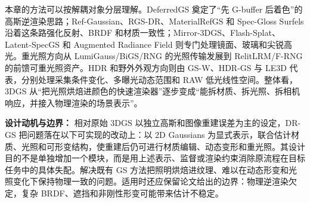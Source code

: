 \begin{takeaway}
本章的方法可以按解耦对象分层理解。DeferredGS 奠定了“先 G-buffer 后着色”的高斯逆渲染思路；Ref-Gaussian、RGS-DR、MaterialRefGS 和 Spec-Gloss Surfels 沿着这条路强化反射、BRDF 和材质一致性；Mirror-3DGS、Flash-Splat、Latent-SpecGS 和 Augmented Radiance Field 则专门处理镜面、玻璃和尖锐高光。重光照方向从 LumiGauss/BiGS/RNG 的光照传输发展到 RelitLRM/F-RNG 的前馈可重光照资产。HDR 和野外外观方向则由 GS-W、HDR-GS 与 LE3D 代表，分别处理采集条件变化、多曝光动态范围和 RAW 低光线性空间。整体看，3DGS 从“把光照烘焙进颜色的快速渲染器”逐步变成“能拆材质、拆光照、拆相机响应，并接入物理渲染的场景表示”。
\end{takeaway}
\textbf{设计动机与边界：} 相对原始 3DGS 以独立高斯和图像重建误差为主的设定，DR-GS 把问题落在以下可实现的改动上：以 2D Gaussians 为显式表示，联合估计材质、光照和可形变结构，使重建后仍可进行材质编辑、动态变形和重光照。其设计目的不是单独增加一个模块，而是用上述表示、监督或渲染约束消除原流程在目标任务中的具体失配。解决既有 GS 方法把照明烘焙进纹理、难以在动态形变和光照变化下保持物理一致的问题。适用时还应保留论文给出的边界：物理逆渲染欠定，复杂 BRDF、遮挡和非刚性形变可能带来估计不稳定。
